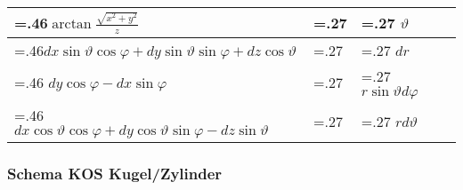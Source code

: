 \begin{tabularx}{0.45\textwidth}{>{\hsize=.46\hsize}X|>{\hsize=.27\hsize}X|>{\hsize=.27\hsize}X}
    \hline
    $\arctan \frac{\sqrt{x^{2}+y^{2}}}{z}$                                               &                  & $\vartheta$                     \\
    \hline
    $d x \sin \vartheta \cos \varphi+d y \sin \vartheta \sin \varphi+d z \cos \vartheta$ &                  & $dr$                            \\
    \hline
    $d y \cos \varphi-d x \sin \varphi$                                                  &                  & $r \sin \vartheta d \varphi$    \\
    \hline
    $d x \cos \vartheta \cos \varphi+d y \cos \vartheta \sin \varphi-d z \sin \vartheta$ &                  & $r d \vartheta$                 \\
\end{tabularx}

\subsubsection{Schema KOS Kugel/Zylinder}
